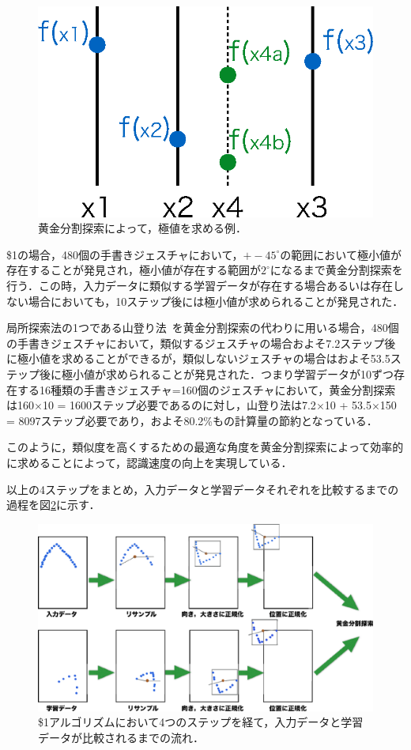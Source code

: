 \begin{figure} [!h]
\centering
\includegraphics [width=0.6\columnwidth]{img/golden.eps}
\caption{黄金分割探索によって，極値を求める例．}
\label{fig:golden}
\end{figure}

\$1の場合，480個の手書きジェスチャにおいて，$+-45^\circ$の範囲において極小値が存在することが発見され，極小値が存在する範囲が$2^\circ$になるまで黄金分割探索を行う．この時，入力データに類似する学習データが存在する場合あるいは存在しない場合においても，10ステップ後には極小値が求められることが発見された．

局所探索法の1つである山登り法~\cite{Park:2009:SFA:1464526.1465112,Department94prototypeand}を黄金分割探索の代わりに用いる場合，480個の手書きジェスチャにおいて，類似するジェスチャの場合およそ7.2ステップ後に極小値を求めることができるが，類似しないジェスチャの場合はおよそ53.5ステップ後に極小値が求められることが発見された．つまり学習データが10ずつ存在する16種類の手書きジェスチャ=160個のジェスチャにおいて，黄金分割探索は160$\times$10 = 1600ステップ必要であるのに対し，山登り法は7.2$\times$10 + 53.5$\times$150 = 8097ステップ必要であり，およそ80.2\%もの計算量の節約となっている．

このように，類似度を高くするための最適な角度を黄金分割探索によって効率的に求めることによって，認識速度の向上を実現している．

以上の4ステップをまとめ，入力データと学習データそれぞれを比較するまでの過程を図\ref{fig:onedoller_flow}に示す．
\begin{figure} [!h]
\centering
\includegraphics [width=0.9\columnwidth]{img/onedoller_flow.eps}
\caption{\$1アルゴリズムにおいて4つのステップを経て，入力データと学習データが比較されるまでの流れ．}
\label{fig:onedoller_flow}
\end{figure}

